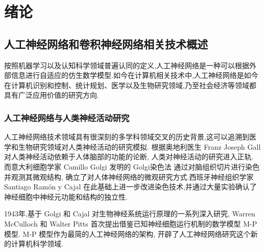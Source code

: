 
\chapter{绪论} \label{chpt:A}

\section{人工神经网络和卷积神经网络相关技术概述}

按照机器学习以及认知科学领域普遍认同的定义,人工神经网络是一种可以根据外部信息进行自适应的仿生数学模型.如今在计算机相关技术中,人工神经网络是如今在计算机识别和控制、统计规划、医学以及生物研究领域,乃至社会经济等领域都具有广泛应用价值的研究方向.

\subsection{人工神经网络与人类神经活动研究}


人工神经网络技术领域具有很深刻的多学科领域交叉的历史背景,这可以追溯到医学和生物研究领域对人类神经活动的研究模拟. 根据奥地利医生 Franz Joseph Gall 对人类神经活动依赖于人体脑部的功能的论断, 人类对神经活动的研究进入正轨. 而意大利细胞学家 Camillo Golgi 发明的 Golgi染色法 通过对脑组织切片进行染色并观测其微观结构, 确立了对人体神经网络的微观研究方式.西班牙神经组织学家 Santiago Ramón y Cajal 在此基础上进一步改进染色技术,并通过大量实验确认了神经细胞中神经元功能和结构的独立性.

1943年,基于 Golgi 和 Cajal 对生物神经系统运行原理的一系列深入研究, Warren McCulloch 和 Walter Pitts 首次提出借鉴已知神经细胞运行机制的数学模型 M-P 模型. M-P 模型作为最简的人工神经网络的架构, 开辟了人工神经网络研究这个新的计算机科学领域.

